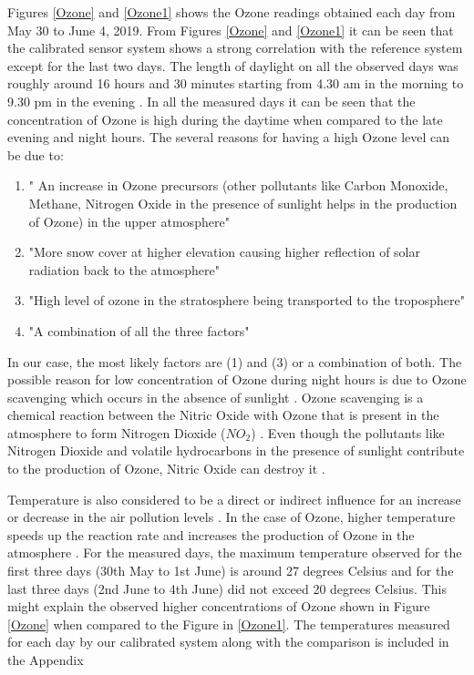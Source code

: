 Figures \ref{Ozone} and \ref{Ozone1} shows the Ozone readings obtained each day from May 30 to June 4, 2019. From Figures \ref{Ozone} and \ref{Ozone1} it can be seen that the calibrated sensor system shows a strong correlation with the reference system except for the last two days. The length of daylight on all the observed days was roughly around 16 hours and 30 minutes starting from 4.30 am in the morning to 9.30 pm in the evening \cite{daylight}. In all the measured days it can be seen that the concentration of Ozone is high during the daytime when compared to the late evening and night hours. The several reasons for having a high Ozone level can be due to:\cite{EnvironmentalQualitySectionMoE2012} 
\begin{enumerate}
  \item " An increase in Ozone precursors (other pollutants like Carbon Monoxide, Methane, Nitrogen Oxide in the presence of sunlight helps in the production of Ozone) in the upper atmosphere" 
  \item "More snow cover at higher elevation causing higher reflection of solar radiation back to the atmosphere" 
  \item "High level of ozone in the stratosphere being transported to the troposphere" 
  \item "A combination of all the three factors" 
\end{enumerate} 
 In our case,  the most likely factors are (1) and (3) or a combination of both. 
The possible reason for low concentration of Ozone during night hours is due to Ozone scavenging which occurs in the absence of sunlight \cite{EnvironmentalQualitySectionMoE2012}. Ozone scavenging is a chemical reaction between the Nitric Oxide with Ozone that is present in the atmosphere to form Nitrogen Dioxide (${NO_2}$) \cite{airqualityontario}. Even though the pollutants like Nitrogen Dioxide and volatile hydrocarbons in the presence of sunlight contribute to the production of Ozone, Nitric Oxide can destroy it \cite{airqualityontario} \cite{EnvironmentalQualitySectionMoE2012}.

 
Temperature is also considered to be a direct or indirect influence for an increase or decrease in the air pollution levels \cite{EnvironmentalQualitySectionMoE2012}. In the case of Ozone, higher temperature speeds up the reaction rate and increases the production of Ozone in the atmosphere \cite{coates2016influence}. For the measured days, the maximum temperature observed for the first three days (30th May to 1st June) is around 27 degrees Celsius and for the last three days (2nd June to 4th June) did not exceed 20 degrees Celsius. This might explain the observed higher concentrations of Ozone shown in Figure \ref{Ozone} when compared to the Figure in \ref{Ozone1}. The temperatures measured for each day by our calibrated system along with the comparison is included in the Appendix 



